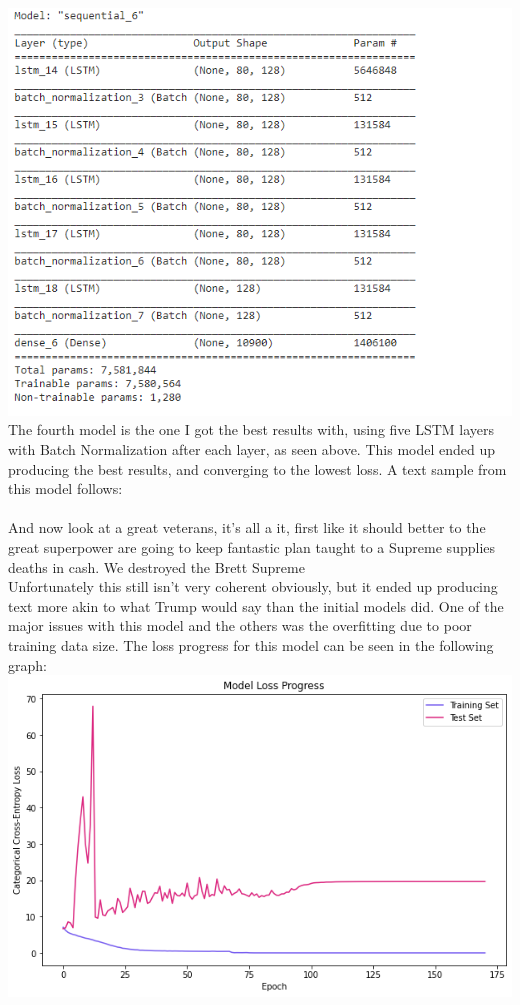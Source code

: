 \documentclass[a4paper]{article}
\begin{document}
\includegraphics{model2}
The fourth model is the one I got the best results with, using five LSTM layers with Batch Normalization after each layer, as seen above. This model ended up producing the best results, and converging to the lowest loss. A text sample from this model follows:
\\ \\
And now look at a great veterans, it's all a it, first
 like it should better to the great superpower are going to keep fantastic plan taught
 to a Supreme supplies deaths in cash. We destroyed the Brett Supreme
\\
Unfortunately this still isn't very coherent obviously, but it ended up producing text more akin to what Trump would say than the initial models did. One of the major issues with this model and the others was the overfitting due to poor training data size. The loss progress for this model can be seen in the following graph: \\
\includegraphics{loss}
\end{document}
